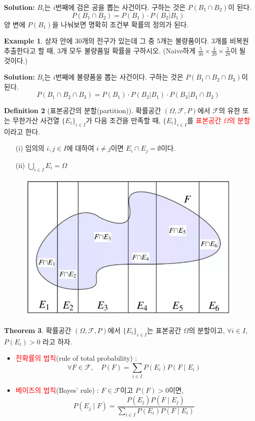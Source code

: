 \documentclass{article}
\theoremstyle{definition}
\newtheorem{theorem}{Theorem}
\newtheorem{definition}[theorem]{Definition}
\newtheorem{example}[theorem]{Example}
\begin{document}
\noindent
\textbf{Solution:} $B_i$는 $i$번째에 검은 공을 뽑는 사건이다. 구하는 것은 $P(B_1 \cap B_2)$이 된다.
\begin{equation*}
    P(B_1 \cap B_2) = P(B_1) \cdot P(B_2 | B_1)
\end{equation*}
양 변에 $P(B_1)$을 나눠보면 명확히 조건부 확률의 정의가 된다.


\begin{example}
    상자 안에 30개의 전구가 있는데 그 중 5개는 불량품이다. 3개를 비복원추출한다고 할 때, 3개 모두 불량품일 확률을 구하시오. (Naive하게 $\frac{5}{30} \times \frac{4}{29} \times \frac{3}{28}$이 될 것이다.)
\end{example}

\noindent
\textbf{Solution:} $B_i$는 $i$번째에 불량품을 뽑는 사건이다. 구하는 것은 $P(B_1 \cap B_2 \cap B_3)$이 된다.
\begin{equation*}
    P(B_1 \cap B_2 \cap B_3) = P(B_1) \cdot P(B_2 | B_1) \cdot P(B_3 | B_1 \cap B_2)
\end{equation*}

\newpage

\begin{definition}[표본공간의 분할(partition)]
    확률공간 $(\Omega, \mathcal{F}, P)$에서 $\mathcal{F}$의 유한 또는 무한가산 사건열 $\{E_i\}_{i \in I}$가 다음 조건을 만족할 때, $\{E_i\}_{i \in I}$를 \textcolor{red}{표본공간 $\Omega$의 분할}이라고 한다.
    \begin{enumerate}
        \item[(i)] 임의의 $i, j \in I$에 대하여 $i \ne j$이면 $E_i \cap E_j = \emptyset$이다.
        \item[(ii)] \(\displaystyle \bigcup_{i \in I} E_i = \Omega\)
    \end{enumerate}
\end{definition}

\begin{figure}[h]
    \centering
    \includegraphics[width = 0.4\linewidth]{image/fig1_2.png}
\end{figure}

\begin{theorem}
    확률공간 $(\Omega, \mathcal{F}, P)$에서 $\{E_i\}_{i \in I}$는 표본공간 $\Omega$의 분할이고, $\forall i \in I$, $P(E_i) > 0$ 라고 하자.
    \begin{itemize}
        \item \textcolor{red}{전확률의 법칙}(rule of total probability) :
        \[
        \forall F \in \mathcal{F}, \quad P(F) = \sum_{i \in I} P(E_i) P(F \mid E_i)
        \]
        \item \textcolor{red}{베이즈의 법칙}(Bayes' rule) : $F \in \mathcal{F}$이고 $P(F) > 0$이면,
        \[
        P(E_j \mid F) = \frac{P(E_j) P(F \mid E_j)}{\sum_{i \in I} P(E_i) P(F \mid E_i)}
        \]
    \end{itemize}
\end{theorem}
\end{document}
